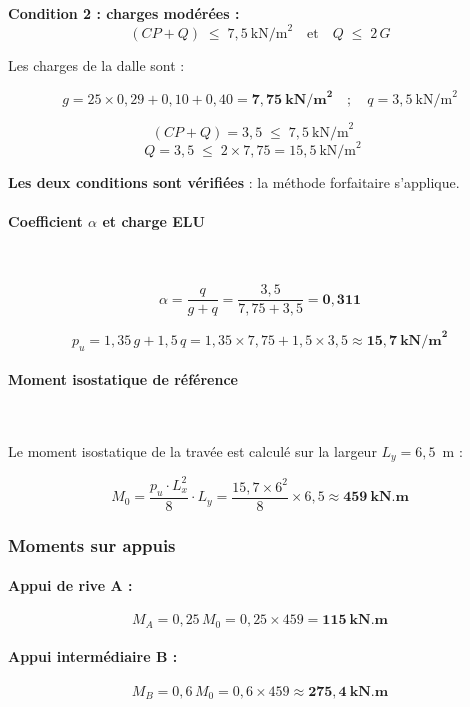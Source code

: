 \textbf{Condition 2 : charges modérées :}
\[
(CP + Q) \;\leq\; 7{,}5~\text{kN/m}^2 \quad\text{et}\quad Q \;\leq\; 2 \, G
\]

Les charges de la dalle sont :

\[
g = 25 \times 0{,}29 + 0{,}10 + 0{,}40 = \mathbf{7{,}75~\text{kN/m}^2}
\quad ; \quad
q = 3{,}5~\text{kN/m}^2
\]

\[
(CP + Q) = 3{,}5 \;\leq\; 7{,}5~\text{kN/m}^2 \quad 
\]
\[
Q = 3{,}5 \;\leq\; 2 \times 7{,}75 = 15{,}5~\text{kN/m}^2 \quad 
\]

\textbf{Les deux conditions sont vérifiées} : la méthode forfaitaire s'applique.

\paragraph{Coefficient \texorpdfstring{$\alpha$}{α} et charge ELU}~

\[
\alpha = \frac{q}{g + q} = \frac{3{,}5}{7{,}75 + 3{,}5} = \mathbf{0{,}311}
\]

\[
p_u = 1{,}35 \, g + 1{,}5 \, q = 1{,}35 \times 7{,}75 + 1{,}5 \times 3{,}5 \approx \mathbf{15{,}7~\text{kN/m}^2}
\]

\paragraph{Moment isostatique de référence}~

Le moment isostatique de la travée est calculé sur la largeur $L_y = 6{,}5$~m :

\[
M_0 = \frac{p_u \cdot L_x^2}{8} \cdot L_y = \frac{15{,}7 \times 6^2}{8} \times 6{,}5 \approx \mathbf{459~\text{kN.m}}
\]

\subsubsection{Moments sur appuis}

\paragraph{Appui de rive A :}
\[
M_A = 0{,}25 \, M_0 = 0{,}25 \times 459 = \mathbf{115~\text{kN.m}}
\]

\paragraph{Appui intermédiaire B :}
\[
M_B = 0{,}6 \, M_0 = 0{,}6 \times 459 \approx \mathbf{275{,}4~\text{kN.m}}
\]


